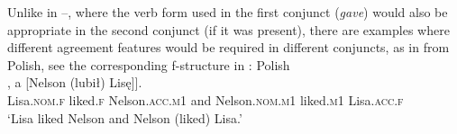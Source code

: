 \documentclass[output=paper]{../langscibook}
\begin{document}
Unlike in –, where the
verb form used in the first conjunct (\emph{gave}) would also be appropriate in
the second conjunct (if it was present), there are examples where
different agreement features would be required in different conjuncts,
as in  from Polish, see the corresponding f-structure in
:
\ea\label{ex:pat:prz:17:28}
  Polish\\\gll
    [[Lisa \tightuline{lubiła} Nelsona], a [Nelson (lubił) Lisę]]. \\
    \phtm{[[}Lisa.\textsc{nom.f} liked.\textsc{f} \phtm{[}Nelson.\textsc{acc.m1} and
    Nelson.\textsc{nom.m1} \phtm{(}liked.\textsc{m1} Lisa.\textsc{acc.f}\\
\glt  ‘Lisa liked Nelson and Nelson (liked) Lisa.’\\ \hspace*{\fill} \citep[(28)]{PatejukPrzepiorkowski2017}
\z
{}
\end{document}
